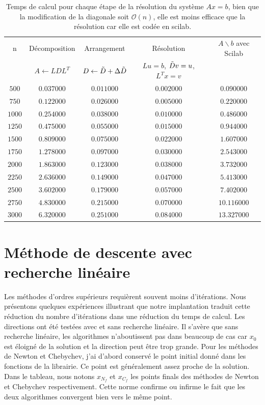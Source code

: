 \begin{table}[h]
	\begin{center}
\begin{tabular}{|c|c|c|c|c|}\hline
n & D\'ecomposition & Arrangement & R\'esolution & $A \backslash b$ avec Scilab\\
 & $A\leftarrow LDL^T$ & $D\leftarrow \Tilde{D}+\Delta \Tilde{D}$& $Lu=b$, $\Tilde{D}v=u$, $L^Tx=v$ & \\
\hline
$500 $&$  0.037000 $&$  0.011000 $&$ 0.002000 $&$ 0.090000$\\\hline
$750 $&$ 0.122000 $&$ 0.026000 $&$ 0.005000 $&$ 0.220000$\\\hline
$1000 $&$ 0.254000 $&$ 0.038000 $&$ 0.010000 $&$ 0.486000$\\\hline
$1250 $&$ 0.475000 $&$ 0.055000 $&$ 0.015000 $&$ 0.944000$\\\hline
$1500 $&$ 0.809000 $&$ 0.075000 $&$ 0.022000 $&$ 1.607000$\\\hline
$1750 $&$ 1.278000 $&$ 0.097000 $&$ 0.030000 $&$ 2.543000$\\\hline
$2000 $&$ 1.863000 $&$ 0.123000 $&$ 0.038000 $&$ 3.732000$\\\hline
$2250 $&$ 2.636000 $&$ 0.149000 $&$ 0.047000 $&$ 5.413000$\\\hline
$2500 $&$ 3.602000 $&$ 0.179000 $&$ 0.057000 $&$ 7.402000$\\\hline
$2750 $&$ 4.830000 $&$ 0.215000 $&$ 0.070000 $&$ 10.116000$\\\hline
$3000 $&$ 6.320000 $&$ 0.251000 $&$ 0.084000 $&$ 13.327000$\\\hline
\end{tabular}
	\end{center}
	\caption{Temps de calcul pour chaque \'etape de la r\'esolution du syst\`eme $Ax=b$, bien que la modification de la diagonale soit
$\mathcal{O}(n)$, elle est moins efficace que la r\'esolution car elle est cod\'ee en scilab.}
	\label{tab:newton}
\end{table}







\section{M\'ethode de descente avec recherche lin\'eaire}
Les m\'ethodes d'ordres sup\'erieurs requi\`erent souvent 
moins d'it\'erations. Nous pr\'esentons quelques exp\'eriences illustrant que notre implantation traduit cette r\'eduction du nombre
d'it\'erations dans une r\'eduction du temps de calcul. Les directions ont \'et\'e test\'ees avec et sans recherche lin\'eaire.
Il s'av\`ere que sans recherche lin\'eaire, les algorithmes n'aboutissent pas dans beaucoup de cas car $x_0$ est \'eloign\'e de la solution et
la direction peut être trop grande.
Pour les m\'ethodes de Newton et Chebychev, j'ai d'abord conserv\'e le point initial donn\'e dans les fonctions
de la librairie. Ce point est g\'en\'eralement assez proche de la solution. Dans le tableau, 
nous notons $x_{N_f}$ et $x_{C_f}$ les points finals des m\'ethodes de Newton et Chebychev respectivement. 
Cette norme confirme ou infirme le fait que les deux algorithmes convergent bien vers le même point.

